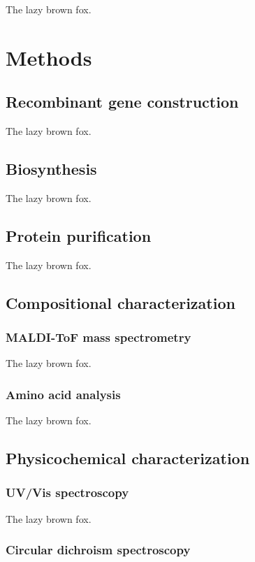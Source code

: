 \begin{refsection}
The lazy brown fox.

\section{Methods}

\subsection{Recombinant gene construction}

The lazy brown fox.

\subsection{Biosynthesis}

The lazy brown fox.

\subsection{Protein purification}

The lazy brown fox.

\subsection{Compositional characterization}

\subsubsection{MALDI-ToF mass spectrometry}

The lazy brown fox.

\subsubsection{Amino acid analysis}

The lazy brown fox.

\subsection{Physicochemical characterization}

\subsubsection{UV/Vis spectroscopy}

The lazy brown fox.

\subsubsection{Circular dichroism spectroscopy}


\end{refsection}
